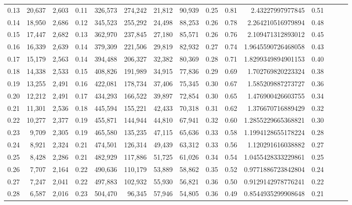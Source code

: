 \begin{tabular}{rrrrrrrrrrrrrrr}
0.13 &  20,637 &  2,603 &  0.11 &  326,573 &  274,242 &   21,812 &   90,939 &  0.25 &  0.81 &       2.43227997977845 &      0.51 \\
0.14 &  18,950 &  2,686 &  0.12 &  345,523 &  255,292 &   24,498 &   88,253 &  0.26 &  0.78 &      2.264210516979894 &      0.48 \\
0.15 &  17,447 &  2,682 &  0.13 &  362,970 &  237,845 &   27,180 &   85,571 &  0.26 &  0.76 &      2.109471312893012 &      0.45 \\
0.16 &  16,339 &  2,639 &  0.14 &  379,309 &  221,506 &   29,819 &   82,932 &  0.27 &  0.74 &     1.9645590726468058 &      0.43 \\
0.17 &  15,179 &  2,563 &  0.14 &  394,488 &  206,327 &   32,382 &   80,369 &  0.28 &  0.71 &     1.8299349894901153 &      0.40 \\
0.18 &  14,338 &  2,533 &  0.15 &  408,826 &  191,989 &   34,915 &   77,836 &  0.29 &  0.69 &      1.702769820223324 &      0.38 \\
0.19 &  13,255 &  2,491 &  0.16 &  422,081 &  178,734 &   37,406 &   75,345 &  0.30 &  0.67 &      1.585209887273727 &      0.36 \\
0.20 &  12,212 &  2,491 &  0.17 &  434,293 &  166,522 &   39,897 &   72,854 &  0.30 &  0.65 &      1.476900426603755 &      0.34 \\
0.21 &  11,301 &  2,536 &  0.18 &  445,594 &  155,221 &   42,433 &   70,318 &  0.31 &  0.62 &      1.376670716889429 &      0.32 \\
0.22 &  10,277 &  2,377 &  0.19 &  455,871 &  144,944 &   44,810 &   67,941 &  0.32 &  0.60 &     1.2855229665368821 &      0.30 \\
0.23 &   9,709 &  2,305 &  0.19 &  465,580 &  135,235 &   47,115 &   65,636 &  0.33 &  0.58 &     1.1994128655178224 &      0.28 \\
0.24 &   8,921 &  2,324 &  0.21 &  474,501 &  126,314 &   49,439 &   63,312 &  0.33 &  0.56 &      1.120291616038882 &      0.27 \\
0.25 &   8,428 &  2,286 &  0.21 &  482,929 &  117,886 &   51,725 &   61,026 &  0.34 &  0.54 &     1.0455428333229861 &      0.25 \\
0.26 &   7,707 &  2,164 &  0.22 &  490,636 &  110,179 &   53,889 &   58,862 &  0.35 &  0.52 &     0.9771886723842804 &      0.24 \\
0.27 &   7,247 &  2,041 &  0.22 &  497,883 &  102,932 &   55,930 &   56,821 &  0.36 &  0.50 &     0.9129142978776241 &      0.22 \\
0.28 &   6,587 &  2,016 &  0.23 &  504,470 &   96,345 &   57,946 &   54,805 &  0.36 &  0.49 &     0.8544935299908648 &      0.21 \\

\end{tabular}

